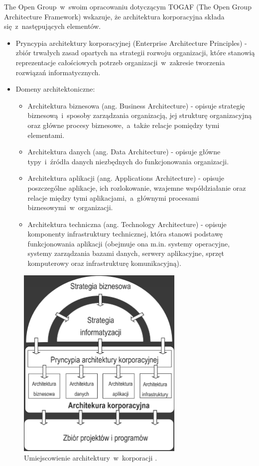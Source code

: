 The Open Group~w~swoim opracowaniu dotyczącym TOGAF (The Open Group Architecture Framework) wskazuje, że architektura korporacyjna składa się~z~następujących elementów.
\begin{itemize}
\item{Pryncypia architektury korporacyjnej (Enterprise Architecture Principles) - zbiór trwałych zasad opartych na strategii rozwoju organizacji, które stanowią reprezentacje całościowych potrzeb organizacji~w~zakresie tworzenia rozwiązań informatycznych.}
\item{Domeny architektoniczne:
\begin{itemize}
\item{Architektura biznesowa (ang. Business Architecture) - opisuje strategię biznesową~i~sposoby zarządzania organizacją, jej strukturę organizacyjną oraz główne procesy biznesowe,~a~także relacje pomiędzy tymi elementami.}
\item{Architektura danych (ang. Data Architecture) - opisuje główne typy~i~źródła danych niezbędnych do funkcjonowania organizacji.}
\item{Architektura aplikacji (ang. Applications Architecture) - opisuje poszczególne aplikacje, ich rozlokowanie, wzajemne współdziałanie oraz relacje między tymi aplikacjami,~a~głównymi procesami biznesowymi~w~organizacji.}
\item{Architektura techniczna (ang. Technology Architecture) - opisuje komponenty infrastruktury technicznej, która stanowi podstawę funkcjonowania aplikacji (obejmuje ona m.in. systemy operacyjne, systemy zarządzania bazami danych, serwery aplikacyjne, sprzęt komputerowy oraz infrastrukturę komunikacyjną).}
\end{itemize}
}
\end{itemize}

\begin{figure}[h!tbp]
\begin{centering}
\includegraphics[width=8cm]{img/ea.png}
\caption[Umiejscowienie architektury~w~korporacji.]{Umiejscowienie architektury~w~korporacji \cite{SOMAArsIBMJour}.}\label{ea_arch}
\end{centering}
\end{figure}

